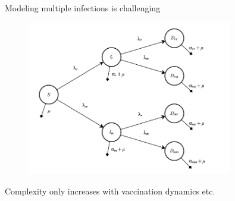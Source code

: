 \documentclass{beamer}
\begin{document}
\begin{frame}{Modeling multiple infections is challenging}
    \begin{figure}
        \centering
            \includegraphics[width=0.8\textwidth]{2022-07-10-22-37-45.png}
    \end{figure}
    \centering
    \vfill
    \tiny{\cite{Alizon_van_Baalen_2008}}
    
\end{frame}

\begin{frame}{Complexity only increases with vaccination dynamics etc.}

\begin{figure}[h!]
    \centering
    \scalebox{0.5}{
    
    }
\label{model_structure}
\end{figure}
\end{frame}
\end{document}
